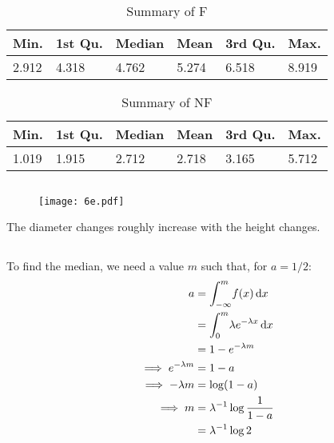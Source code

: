 \documentclass[twocolumn]{article}
\begin{document}
\subsection{}
\begin{table}[h]
\begin{tabular}{@{}llllll@{}}
\toprule
Min.  & 1st Qu. & Median & Mean  & 3rd Qu. & Max.  \\ \midrule
2.912 & 4.318   & 4.762  & 5.274 & 6.518   & 8.919 \\ \bottomrule
\end{tabular}
\caption{Summary of F}
\end{table}
\begin{table}[h]
\begin{tabular}{llllll}
\toprule
Min.  & 1st Qu. & Median & Mean  & 3rd Qu. & Max.  \\ \midrule
1.019 & 1.915   & 2.712  & 2.718 & 3.165   & 5.712 \\ \bottomrule
\end{tabular}
\caption{Summary of NF}
\end{table}

\newpage

\subsection{}
\begin{figure}[h]
\centering
\texttt{[image: 6e.pdf]}
\end{figure}
The diameter changes roughly increase with the height changes.

\subsection{}
To find the median, we need a value $m$ such that, for $a=1/2$:
\begin{align*}
a	& = \int_{-\infty}^{m} \! f(x) \, \mathrm{d} x	\\
	& = \int_{0}^{m} \! \lambda  e^{-\lambda  x} \, \mathrm{d} x \\
	& = 1-e^{-\lambda m}\\
\implies e^{-\lambda m} &= 1-a \\
\implies -\lambda m		&= \log (1-a) \\
\implies m				&= \lambda^{-1}\log\frac{1}{1-a} \\
&= \lambda^{-1}\log 2
\end{align*}
\end{document}
